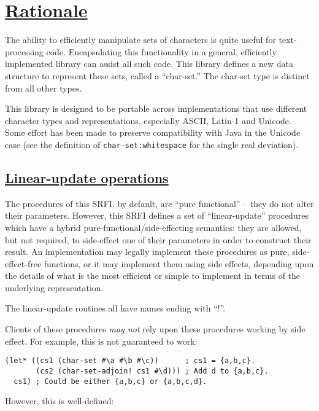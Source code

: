 \section{\texorpdfstring{\href{}{Rationale}}{Rationale}}\label{rationale}

The ability to efficiently manipulate sets of characters is quite useful
for text-processing code. Encapsulating this functionality in a general,
efficiently implemented library can assist all such code. This library
defines a new data structure to represent these sets, called a
``char-set.'' The char-set type is distinct from all other types.

This library is designed to be portable across implementations that use
different character types and representations, especially ASCII, Latin-1
and Unicode. Some effort has been made to preserve compatibility with
Java in the Unicode case (see the definition of
\texttt{char-set:whitespace} for the single real deviation).

\subsection{\texorpdfstring{\href{}{Linear-update
operations}}{Linear-update operations}}\label{linear-update-operations}

The procedures of this SRFI, by default, are ``pure functional'' -- they
do not alter their parameters. However, this SRFI defines a set of
``linear-update'' procedures which have a hybrid
pure-functional/side-effecting semantics: they are allowed, but not
required, to side-effect one of their parameters in order to construct
their result. An implementation may legally implement these procedures
as pure, side-effect-free functions, or it may implement them using side
effects, depending upon the details of what is the most efficient or
simple to implement in terms of the underlying representation.

The linear-update routines all have names ending with ``!''.

Clients of these procedures \emph{may not} rely upon these procedures
working by side effect. For example, this is not guaranteed to work:

\begin{verbatim}
(let* ((cs1 (char-set #\a #\b #\c))      ; cs1 = {a,b,c}.
       (cs2 (char-set-adjoin! cs1 #\d))) ; Add d to {a,b,c}.
  cs1) ; Could be either {a,b,c} or {a,b,c,d}.
\end{verbatim}

However, this is well-defined:


